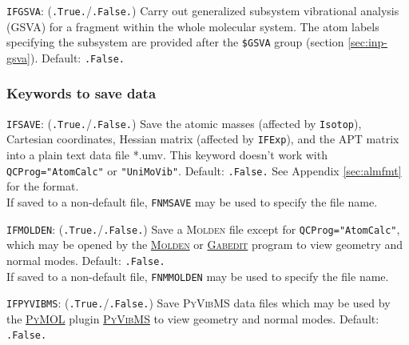 \documentclass[12pt,english]{extarticle}
\begin{document}
\bigskip{}\bigskip{}
\verb|IFGSVA|: (\verb|.True.|/\verb|.False.|)   Carry out generalized subsystem vibrational analysis (GSVA) for a fragment within the whole molecular system. The atom labels specifying the subsystem are provided after the  \verb|$GSVA| group (section \ref{sec:inp-gsva}).
Default: \verb|.False.|


\subsubsection{Keywords to save data} \label{subsec:inp-qcdata-save}

\bigskip{}\bigskip{}
\verb|IFSAVE|: (\verb|.True.|/\verb|.False.|) Save the atomic masses (affected by
\verb|Isotop|), Cartesian coordinates, Hessian matrix (affected by
\verb|IFExp|), and the APT matrix into a plain text data file *.umv. This keyword
doesn't work with \verb|QCProg="AtomCalc"| or \verb|"UniMoVib"|. Default: \verb|.False.| See Appendix \ref{sec:almfmt} for the format. \\
If saved to a non-default file, \verb|FNMSAVE| may be used to specify the file name.

\bigskip{}\bigskip{}
\verb|IFMOLDEN|: (\verb|.True.|/\verb|.False.|) Save a \textsc{Molden} file except for \verb|QCProg="AtomCalc"|, which may be opened by the \href{https://www.theochem.ru.nl/molden/}{\textsc{Molden}} or \href{http://gabedit.sourceforge.net/}{\textsc{Gabedit}} program to view geometry and normal modes. Default: \verb|.False.|  \\
If saved to a non-default file, \verb|FNMMOLDEN| may be used to specify the file name.

\bigskip{}\bigskip{}
\verb|IFPYVIBMS|: (\verb|.True.|/\verb|.False.|) Save \textsc{PyVibMS} data files which may be used by the \href{https://pymol.org/}{\textsc{PyMOL}} plugin \href{https://github.com/smutao/PyVibMS}{\textsc{PyVibMS}} to view geometry and normal modes.
Default: \verb|.False.|
\end{document}
